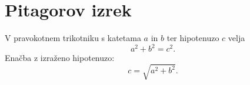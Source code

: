 \documentclass{article}
\begin{document}
\section*{Pitagorov izrek}
V pravokotnem trikotniku s katetama \(a\) in \(b\) ter hipotenuzo \(c\) velja
\[ a^2 + b^2 = c^2 .\]
Enačba z izraženo hipotenuzo:
\[c = \sqrt{a^2 + b^2}.\]
\end{document}
